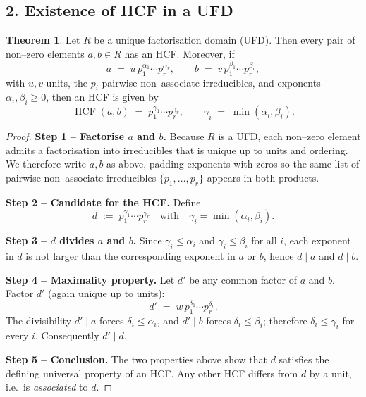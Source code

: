 \documentclass[12pt]{article}
\theoremstyle{definition} %
\newtheorem{theorem}{Theorem}
\theoremstyle{plain} %
\begin{document}
\subsection*{2.  Existence of HCF in a UFD}

\begin{theorem}
  Let \(R\) be a unique factorisation domain (UFD).
  Then every pair of non–zero elements \(a,b\in R\) has an HCF.
  Moreover, if
  \[
      a \;=\; u\,p_{1}^{\alpha_{1}}\cdots p_{r}^{\alpha_{r}},
      \qquad
      b \;=\; v\,p_{1}^{\beta_{1}}\cdots p_{r}^{\beta_{r}},
  \]
  with \(u,v\) units, the \(p_{i}\) pairwise non–associate irreducibles,
  and exponents \(\alpha_{i},\beta_{i}\ge0\),
  then an HCF is given by
  \[
      \operatorname{HCF}(a,b)
      \;=\;
      p_{1}^{\gamma_{1}}\cdots p_{r}^{\gamma_{r}},
      \qquad
      \gamma_{i} \;=\; \min(\alpha_{i},\beta_{i}).
  \]
\end{theorem}

\begin{proof}
  \textbf{Step 1 – Factorise \(a\) and \(b\).}  
  Because \(R\) is a UFD, each non–zero element admits a factorisation
  into irreducibles that is unique up to units and ordering.
  We therefore write \(a,b\) as above, padding exponents with zeros so the
  same list of pairwise non–associate irreducibles \(\{p_{1},\dots,p_{r}\}\)
  appears in both products.

  \textbf{Step 2 – Candidate for the HCF.}  
  Define
  \[
      d \;:=\; p_{1}^{\gamma_{1}}\cdots p_{r}^{\gamma_{r}}
      \quad\text{with}\quad
      \gamma_{i}=\min(\alpha_{i},\beta_{i}).
  \]

  \textbf{Step 3 – \(d\) divides \(a\) and \(b\).}  
  Since \(\gamma_{i}\le\alpha_{i}\) and \(\gamma_{i}\le\beta_{i}\) for all \(i\),
  each exponent in \(d\) is not larger than the corresponding exponent in
  \(a\) or \(b\), hence \(d\mid a\) and \(d\mid b\).

  \textbf{Step 4 – Maximality property.}  
  Let \(d'\) be any common factor of \(a\) and \(b\).
  Factor \(d'\) (again unique up to units):
  \[
      d' \;=\; w\,p_{1}^{\delta_{1}}\cdots p_{r}^{\delta_{r}} .
  \]
  The divisibility \(d'\mid a\) forces \(\delta_{i}\le\alpha_{i}\), and
  \(d'\mid b\) forces \(\delta_{i}\le\beta_{i}\); therefore
  \(\delta_{i}\le\gamma_{i}\) for every \(i\).
  Consequently \(d'\mid d\).

  \textbf{Step 5 – Conclusion.}  
  The two properties above show that \(d\) satisfies the defining
  universal property of an HCF.  
  Any other HCF differs from \(d\) by a unit, i.e.\ is \emph{associated} to \(d\).
\end{proof}
\end{document}
